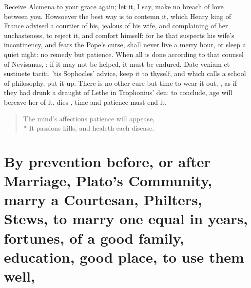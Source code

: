 Receive Alcmena to your grace again; let it, I say, make no breach of
love between you. Howsoever the best way is to contemn it, which
Henry  king of France advised a courtier of his, jealous of
his wife, and complaining of her unchasteness, to reject it, and
comfort himself; for he that suspects his wife's incontinency, and
fears the Pope's curse, shall never live a merry hour, or sleep a quiet
night: no remedy but patience. When all is done according to that
counsel of Nevisanus, : if it may not be helped, it must be endured. Date veniam
et sustinete taciti, 'tis Sophocles' advice, keep it to thyself, and
which \Chrysostom calls 
a school of philosophy, put it up. There is no other cure but time to
wear it out, , as if they had drunk a
draught of Lethe in Trophonius' den: to conclude, age will bereave her
of it, dies , time and patience must end it.
%
\begin{verse}%
The mind's affections patience will appease,\\*
It passions kills, and healeth each disease.
\end{verse}%
%
\section[By prevention before or after Marriage]{By prevention before, or after Marriage, Plato's Community, marry a Courtesan, Philters, Stews, to marry one equal in years, fortunes, of a good family, education, good place, to use them well, \etc{}}

